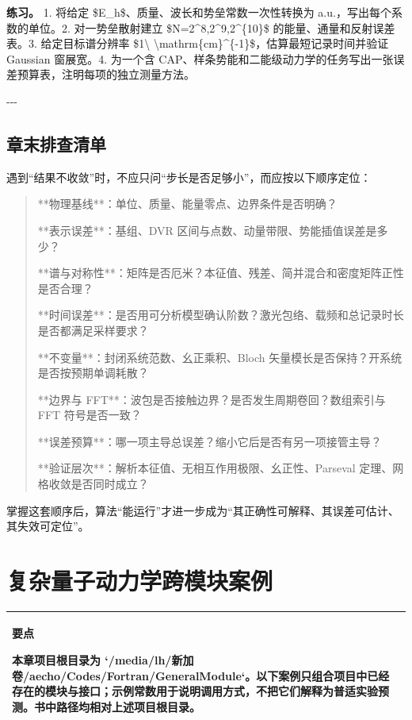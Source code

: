 \documentclass[UTF8,openany,11pt,fontset=fandol]{ctexbook}
\begin{document}
\textbf{练习。} 1. 将给定 \$E\_h\$、质量、波长和势垒常数一次性转换为
a.u.，写出每个系数的单位。2. 对一势垒散射建立
\$N=2\^{}8,2\^{}9,2\^{}\{10\}\$ 的能量、通量和反射误差表。3.
给定目标谱分辨率 \$1\textbackslash{}
\textbackslash mathrm\{cm\}\^{}\{-1\}\$，估算最短记录时间并验证 Gaussian
窗展宽。4. 为一个含
CAP、样条势能和二能级动力学的任务写出一张误差预算表，注明每项的独立测量方法。

-\/-\/-

\section{\texorpdfstring{\textbf{章末排查清单}}{章末排查清单}}\label{ux7ae0ux672bux6392ux67e5ux6e05ux5355}

遇到``结果不收敛''时，不应只问``步长是否足够小''，而应按以下顺序定位：

\begin{quote}
**物理基线**：单位、质量、能量零点、边界条件是否明确？

**表示误差**：基组、DVR 区间与点数、动量带限、势能插值误差是多少？

**谱与对称性**：矩阵是否厄米？本征值、残差、简并混合和密度矩阵正性是否合理？

**时间误差**：是否用可分析模型确认阶数？激光包络、载频和总记录时长是否都满足采样要求？

**不变量**：封闭系统范数、幺正乘积、Bloch
矢量模长是否保持？开系统是否按预期单调耗散？

**边界与 FFT**：波包是否接触边界？是否发生周期卷回？数组索引与 FFT
符号是否一致？

**误差预算**：哪一项主导总误差？缩小它后是否有另一项接管主导？

**验证层次**：解析本征值、无相互作用极限、幺正性、Parseval
定理、网格收敛是否同时成立？
\end{quote}

掌握这套顺序后，算法``能运行''才进一步成为``其正确性可解释、其误差可估计、其失效可定位''。

\chapter{复杂量子动力学跨模块案例}\label{ux6df1ux5316ux7248ux6559ux79d1ux4e66ux590dux6742ux91cfux5b50ux52a8ux529bux5b66ux8de8ux6a21ux5757ux6848ux4f8b}

\begin{longtable}[]{@{}l@{}}
\toprule
\endhead
\begin{minipage}[t]{0.97\columnwidth}\raggedright
\textbf{要点}

本章项目根目录为
`/media/lh/新加卷/aecho/Codes/Fortran/GeneralModule`。以下案例只组合项目中已经存在的模块与接口；示例常数用于说明调用方式，不把它们解释为普适实验预测。书中路径均相对上述项目根目录。\strut
\end{minipage}\tabularnewline
\bottomrule
\end{longtable}
\end{document}
